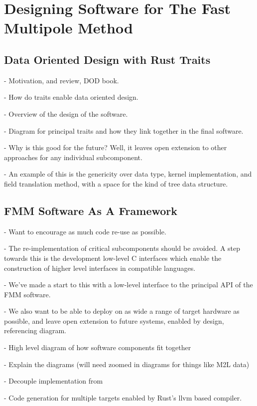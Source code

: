 \chapter{Designing Software for The Fast Multipole Method}\label{chpt:designing_software_for_fmm}
\thispagestyle{chaptertitle} %


\section{Data Oriented Design with Rust Traits}

- Motivation, and review, DOD book.

- How do traits enable data oriented design.

- Overview of the design of the software.

- Diagram for principal traits and how they link together in the final software.

- Why is this good for the future? Well, it leaves open extension to other approaches for any individual subcomponent.

- An example of this is the genericity over data type, kernel implementation, and field translation method, with a space for the kind of tree data structure.

\section{FMM Software As A Framework}

- Want to encourage as much code re-use as possible.

- The re-implementation of critical subcomponents should be avoided. A step towards this is the development low-level C interfaces which enable the construction of higher level interfaces in compatible languages.

- We've made a start to this with a low-level interface to the principal API of the FMM software.


- We also want to be able to deploy on as wide a range of target hardware as possible, and leave open extension to future systems, enabled by design, referencing diagram.

- High level diagram of how software components fit together

- Explain the diagrams (will need zoomed in diagrams for things like M2L data)

- Decouple implementation from

- Code generation for multiple targets enabled by Rust's llvm based compiler.

